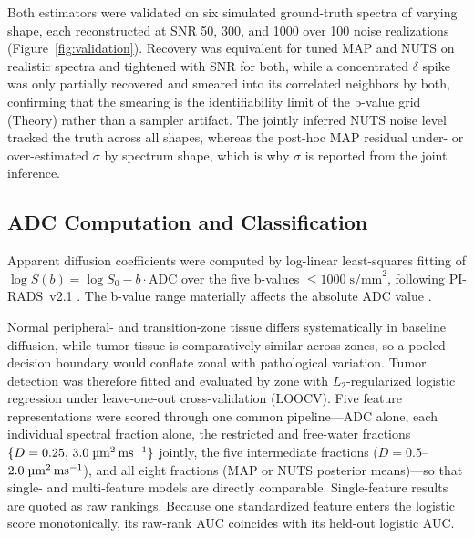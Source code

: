 Both estimators were validated on six simulated ground-truth spectra of varying shape, each reconstructed at SNR 50, 300, and 1000 over 100 noise realizations (Figure~\ref{fig:validation}).
Recovery was equivalent for tuned MAP and NUTS on realistic spectra and tightened with SNR for both, while a concentrated $\delta$ spike was only partially recovered and smeared into its correlated neighbors by both, confirming that the smearing is the identifiability limit of the b-value grid (Theory) rather than a sampler artifact. The jointly inferred NUTS noise level tracked the truth across all shapes, whereas the post-hoc MAP residual under- or over-estimated $\sigma$ by spectrum shape, which is why $\sigma$ is reported from the joint inference.

\subsection{ADC Computation and Classification}

Apparent diffusion coefficients were computed by log-linear least-squares fitting of $\log S(b) = \log S_0 - b \cdot \text{ADC}$ over the five b-values $\leq 1000\;\text{s/mm}^2$, following PI-RADS~v2.1 \citep{turkbey2019prostate}. The b-value range materially affects the absolute ADC value \citep{maier2022choice}.

Normal peripheral- and transition-zone tissue differs systematically in baseline diffusion, while tumor tissue is comparatively similar across zones, so a pooled decision boundary would conflate zonal with pathological variation. Tumor detection was therefore fitted and evaluated by zone with $L_2$-regularized logistic regression under leave-one-out cross-validation (LOOCV).
Five feature representations were scored through one common pipeline---ADC alone, each individual spectral fraction alone, the restricted and free-water fractions $\{D = 0.25,\,3.0\;\si{\micro\meter\squared\per\milli\second}\}$ jointly, the five intermediate fractions ($D = 0.5$--$2.0\;\si{\micro\meter\squared\per\milli\second}$), and all eight fractions (MAP or NUTS posterior means)---so that single- and multi-feature models are directly comparable. Single-feature results are quoted as raw rankings. Because one standardized feature enters the logistic score monotonically, its raw-rank AUC coincides with its held-out logistic AUC.

